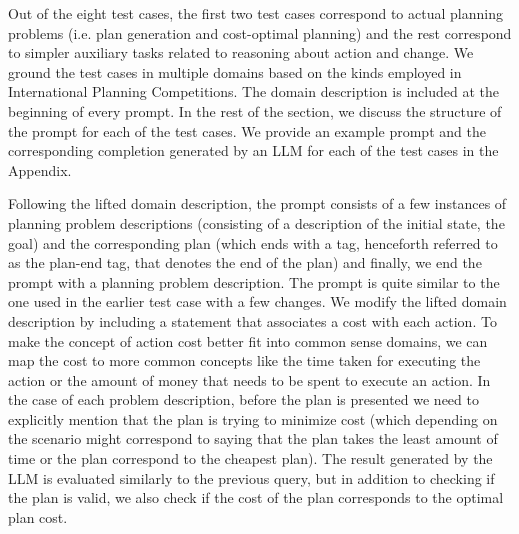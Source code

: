 Out of the eight test cases, the first two test cases correspond to actual planning problems (i.e. plan generation and cost-optimal planning) and the rest correspond to simpler auxiliary tasks related to reasoning about action and change. We ground the test cases in multiple domains based on the kinds employed in International Planning Competitions. The domain description is included at the beginning of every prompt. In the rest of the section, we discuss the structure of the prompt for each of the test cases. We provide an example prompt and the corresponding completion generated by an LLM for each of the test cases in the Appendix. 

Following the lifted domain description, the prompt consists of a few instances of planning problem descriptions (consisting of a description of the initial state, the goal) and the corresponding plan (which ends with a tag, henceforth referred to as the plan-end tag, that denotes the end of the plan) and finally, we end the prompt with a planning problem description. {}
The prompt is quite similar to the one used in the earlier test case with a few changes. We modify the lifted domain description by including a statement that associates a cost with each action. To make the concept of action cost better fit into common sense domains, we can map the cost to more common concepts like the time taken for executing the action or the amount of money that needs to be spent to execute an action. In the case of each problem description, before the plan is presented we need to explicitly mention that the plan is trying to minimize cost (which depending on the scenario might correspond to saying that the plan takes the least amount of time or the plan correspond to the cheapest plan). The result generated by the LLM is evaluated similarly to the previous query, but in addition to checking if the plan is valid, we also check if the cost of the plan corresponds to the optimal plan cost.


